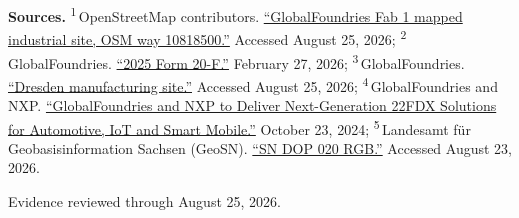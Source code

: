 \begin{minipage}[t][0.90\textheight][t]{\textwidth}
{\sffamily\scriptsize\setlength{\emergencystretch}{1.5em}\textbf{Sources.} \textsuperscript{1}\,OpenStreetMap contributors. \href{\detokenize{https://www.openstreetmap.org/way/10818500}}{\enquote{GlobalFoundries Fab 1 mapped industrial site, OSM way 10818500.}} Accessed August 25, 2026; \textsuperscript{2}\,GlobalFoundries. \href{\detokenize{https://investors.gf.com/static-files/ef3116da-5334-46e0-9b6c-56d3e67b1b92}}{\enquote{2025 Form 20-F.}} February 27, 2026; \textsuperscript{3}\,GlobalFoundries. \href{\detokenize{https://gf.com/manufacturing/dresden/}}{\enquote{Dresden manufacturing site.}} Accessed August 25, 2026; \textsuperscript{4}\,GlobalFoundries and NXP. \href{\detokenize{https://gf.com/news-and-events/news/globalfoundries-and-nxp-to-deliver-next-generation-22fdx-solutions-for-automotive-iot-and-smart-mobile/}}{\enquote{GlobalFoundries and NXP to Deliver Next-Generation 22FDX Solutions for Automotive, IoT and Smart Mobile.}} October 23, 2024; \textsuperscript{5}\,Landesamt für Geobasisinformation Sachsen (GeoSN). \href{\detokenize{https://geomis.sachsen.de/geomis-client/?lang=de}\#\detokenize{/datasets/iso/1d088a9c-a3bb-4682-a3cb-10129e2f2be0}}{\enquote{SN DOP 020 RGB.}} Accessed August 23, 2026.\par}
\vfill
\noindent{\color{hairline}\rule{\linewidth}{0.4pt}}\par\smallskip
{\sffamily\scriptsize\color{black!58} Evidence reviewed through August 25, 2026.\par}
\end{minipage}
\clearpage
